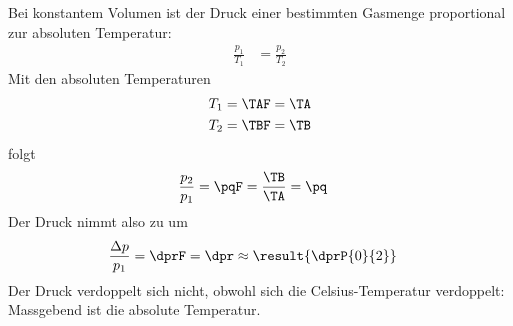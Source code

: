 Bei konstantem Volumen ist der Druck einer bestimmten Gasmenge proportional zur absoluten Temperatur:
\begin{align}
 \frac{p_1}{T_1} &= \frac{p_2}{T_2}
\end{align}
Mit den absoluten Temperaturen
\begin{align}
 T_1 &= \TAF = \TA \\
 T_2 &= \TBF = \TB
\end{align}
folgt
\begin{align}
 \frac{p_2}{p_1} &= \pqF = \frac{\TB}{\TA} = \pq
\end{align}
Der Druck nimmt also zu um
\begin{align}
 \frac{\Delta p}{p_1} &= \dprF = \dpr \approx \result{\dprP{0}{2}}
\end{align}
Der Druck verdoppelt sich nicht, obwohl sich die Celsius-Temperatur verdoppelt: Massgebend ist die absolute Temperatur.
